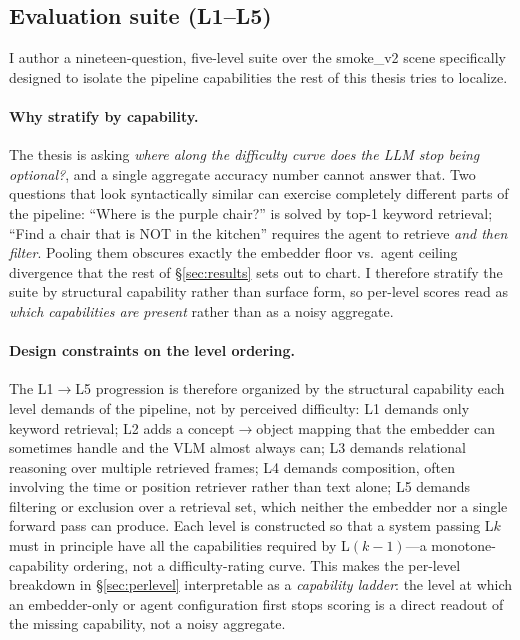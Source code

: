 \documentclass[12pt,letterpaper,oneside]{article}
\begin{document}
\subsection{Evaluation suite (L1--L5)}\label{sec:suite}

I author a nineteen-question, five-level suite over the smoke\_v2
scene specifically designed to isolate the pipeline capabilities the
rest of this thesis tries to localize.

\paragraph{Why stratify by capability.}
The thesis is asking \emph{where along the difficulty curve does the
LLM stop being optional?}, and a single aggregate accuracy number
cannot answer that. Two questions that look syntactically similar can
exercise completely different parts of the pipeline: ``Where is the
purple chair?'' is solved by top-1 keyword retrieval; ``Find a chair
that is NOT in the kitchen'' requires the agent to retrieve
\emph{and then filter}. Pooling them obscures exactly the embedder
floor vs.\ agent ceiling divergence that the rest of \S\ref{sec:results}
sets out to chart. I therefore stratify the suite by structural
capability rather than surface form, so per-level scores read as
\emph{which capabilities are present} rather than as a noisy
aggregate.

\paragraph{Design constraints on the level ordering.}
The L1$\to$L5 progression is therefore organized by the structural
capability each level demands of the pipeline, not by perceived
difficulty: L1 demands only keyword retrieval; L2 adds a
concept$\to$object mapping that the embedder can sometimes handle and
the VLM almost always can; L3 demands relational reasoning over
multiple retrieved frames; L4 demands composition, often involving the
time or position retriever rather than text alone; L5 demands
filtering or exclusion over a retrieval set, which neither the
embedder nor a single forward pass can produce.  Each level is
constructed so that a system passing L$k$ must in principle have all
the capabilities required by L$(k{-}1)$---a monotone-capability
ordering, not a difficulty-rating curve.  This makes the per-level
breakdown in \S\ref{sec:perlevel} interpretable as a \emph{capability
ladder}: the level at which an embedder-only or agent configuration
first stops scoring is a direct readout of the missing capability,
not a noisy aggregate.
\end{document}
